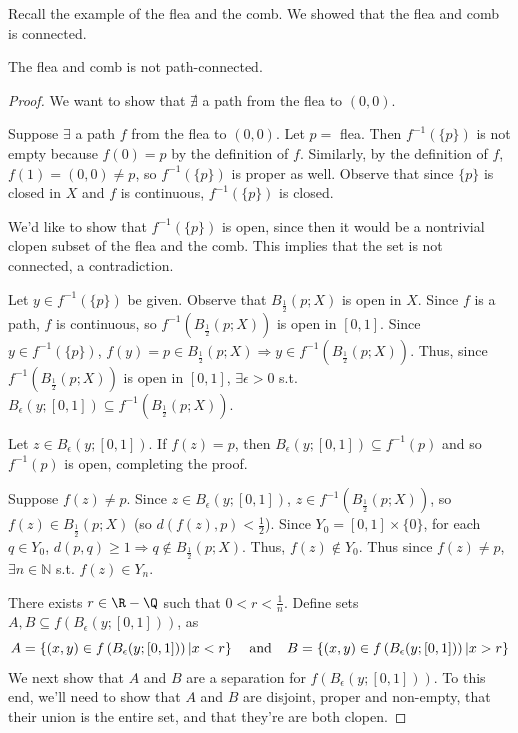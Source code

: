 Recall the example of the flea and the comb.  We showed that the flea and comb is connected.
\begin{theorem}
The flea and comb is not path-connected.
\end{theorem}
\begin{proof}
We want to show that $\nexists$ a path from the flea to $(0,0)$. 

Suppose $\exists$ a  path $f$ from the flea to $(0,0)$. Let $p =$ flea. Then $f^{-1}(\{p\})$ is not empty because $f(0) = p$ by the definition of $f$. Similarly, by the definition of $f$, $f(1) = (0,0) \neq p$, so $f^{-1}(\{p\})$ is proper as well. Observe that since $\{p\}$ is closed in $X$ and $f$ is continuous, $f^{-1}(\{p\})$ is closed.

We'd like to show that $f^{-1}(\{p\})$ is open, since then it would be a nontrivial clopen subset of the flea and the comb.  This implies that the set is not connected, a contradiction.

Let $y \in f^{-1}(\{p\})$ be given. 
Observe that $B_{\frac{1}{2}}(p; X)$ is open in $X$. Since $f$ is a path, $f$ is continuous, so $f^{-1}(B_{\frac{1}{2}}(p; X))$ is open in $[0,1]$. Since $y \in f^{-1}(\{p\})$, $f(y) = p \in B_{\frac{1}{2}}(p; X) \Rightarrow y \in f^{-1}(B_{\frac{1}{2}}(p; X))$. Thus, since $f^{-1}(B_{\frac{1}{2}}(p; X))$ is open in $[0,1]$, $\exists \epsilon > 0$ s.t. $B_{\epsilon}(y; [0,1]) \subseteq f^{-1}(B_{\frac{1}{2}}(p; X))$.

Let $z \in B_{\epsilon}(y; [0,1])$.  If $f(z) = p$, then $B_{\epsilon}(y; [0,1]) \subseteq f^{-1}(p)$ and so $f^{-1}(p)$ is open, completing the proof.

Suppose $f(z) \neq p$. Since $z \in B_{\epsilon}(y; [0,1])$, $z \in f^{-1}(B_{\frac{1}{2}}(p; X))$, so $f(z) \in B_{\frac{1}{2}}(p; X)$ (so $d(f(z), p) < \frac{1}{2}$). Since $Y_0 = [0,1] \times \{0\}$, for each $q \in Y_0$, $d(p,q) \geq 1 \Rightarrow q \not\in B_{\frac{1}{2}}(p; X)$. Thus, $f(z) \not\in Y_0$. Thus since $f(z) \neq p$, $\exists n \in \mathbb{N}$ s.t. $f(z) \in Y_n$.

There exists $r\in \R-\Q$ such that $0 < r < \frac{1}{n}$. Define sets $A, B\subseteq f\left( B_{\epsilon} (y;[0,1]) \right)$, as  
\[A = \left\{ (x,y)\in f\left( B_{\epsilon} (y;[0,1]) \right) | x< r\right\} \hspace{.15in} \text{and} \hspace{.15in} B =  \left\{ (x,y)\in f\left( B_{\epsilon} (y;[0,1]) \right) | x> r\right\}\]
We next show that $A$ and $B$ are a separation for $f\left( B_{\epsilon} (y;[0,1]) \right)$. To this end, we'll need to show that $A$ and $B$ are disjoint, proper and non-empty, that their union is the entire set, and that they're are both clopen.


\end{proof}
